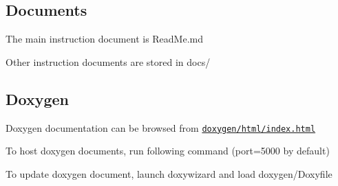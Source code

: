 \subsection*{Documents}


\begin{DoxyItemize}
\item The main instruction document is Read\+Me.md
\item Other instruction documents are stored in docs/
\end{DoxyItemize}

\subsection*{Doxygen}


\begin{DoxyItemize}
\item Doxygen documentation can be browsed from \href{doxygen/html/index.html}{\tt doxygen/html/index.\+html}
\item To host doxygen documents, run following command (port=5000 by default) 

\item To update doxygen document, launch doxywizard and load doxygen/\+Doxyfile 
\end{DoxyItemize}